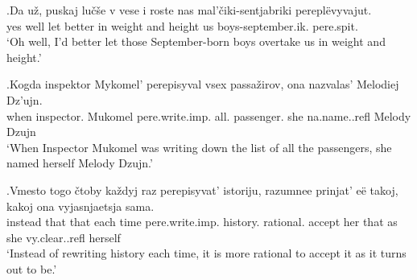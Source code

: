 \exg.\label{ex:pere:imp:compar}Da u\v{z}, puskaj lu\v{c}\v{s}e v vese i roste nas mal'\v{c}iki-sentjabriki perepl\"{e}vyvajut.\\
yes well let better in weight and height us boys-september.ik. pere.spit.\\
\trans `Oh well, I'd better let those September-born boys overtake us in weight and height.'

\exg.\label{ex:pare:imp:distr}Kogda inspektor Mykomel' perepisyval vsex passa\v{z}irov, ona nazvalas' Melodiej Dz'ujn.\\
when inspector. Mukomel pere.write.imp. all. passenger. she na.name..refl Melody Dzujn\\
`When Inspector Mukomel was writing down the list of all the passengers, she named herself Melody Dzujn.'\\

\exg.\label{ex:pere:imp:iter}Vmesto togo \v{c}toby ka\v{z}dyj raz perepisyvat' istoriju, razumnee prinjat' e\"{e} takoj, kakoj ona vyjasnjaetsja sama.\\
instead that that each time pere.write.imp. history. rational. accept her that as she vy.clear..refl herself\\
\trans `Instead of rewriting history each time, it is more rational to accept it as it turns out to be.'\\

